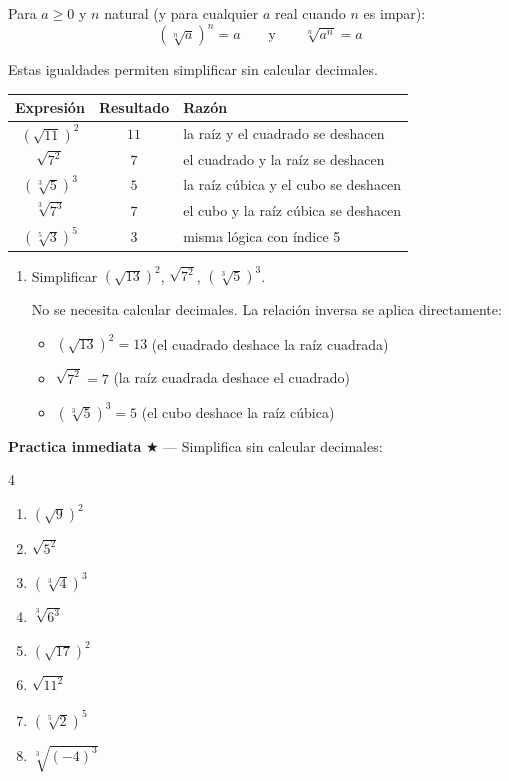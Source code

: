 \documentclass[11pt, letterpaper]{article}
\begin{document}
\begin{tcolorbox}[importantbox, title={Relación inversa — para cualquier índice}]
Para $a \geq 0$ y $n$ natural (y para cualquier $a$ real cuando $n$ es impar):
$$\left(\sqrt[n]{a}\right)^n = a \qquad\text{y}\qquad \sqrt[n]{a^n} = a$$

Estas igualdades permiten simplificar sin calcular decimales.
\begin{center}
\renewcommand{\arraystretch}{1.25}
\begin{tabular}{c|c|l}
\toprule
\textbf{Expresión} & \textbf{Resultado} & \textbf{Razón}\\
\midrule
$(\sqrt{11})^2$   & $11$ & la raíz y el cuadrado se deshacen\\
$\sqrt{7^2}$      & $7$  & el cuadrado y la raíz se deshacen\\
$(\sqrt[3]{5})^3$ & $5$  & la raíz cúbica y el cubo se deshacen\\
$\sqrt[3]{7^3}$   & $7$  & el cubo y la raíz cúbica se deshacen\\
$(\sqrt[5]{3})^5$ & $3$  & misma lógica con índice 5\\
\bottomrule
\end{tabular}
\end{center}
\end{tcolorbox}

\begin{tcolorbox}[examplebox, title={Ejemplos — relación inversa}]
\begin{enumerate}[label=\textbf{Ej. \arabic*.}, leftmargin=*, itemsep=10pt]
\item Simplificar $(\sqrt{13})^2$, $\sqrt{7^2}$, $(\sqrt[3]{5})^3$.

No se necesita calcular decimales. La relación inversa se aplica directamente:
\begin{itemize}[itemsep=3pt]
  \item $(\sqrt{13})^2 = 13$ \hfill (el cuadrado deshace la raíz cuadrada)
  \item $\sqrt{7^2} = 7$ \hfill (la raíz cuadrada deshace el cuadrado)
  \item $(\sqrt[3]{5})^3 = 5$ \hfill (el cubo deshace la raíz cúbica)
\end{itemize}
\end{enumerate}
\end{tcolorbox}

\medskip
\textbf{Practica inmediata} \quad $\bigstar$ — Simplifica sin calcular decimales:
\begin{multicols}{4}
\begin{enumerate}[label=\alph*), leftmargin=*]
  \item $(\sqrt{9})^2$
  \item $\sqrt{5^2}$
  \item $(\sqrt[3]{4})^3$
  \item $\sqrt[3]{6^3}$
  \item $(\sqrt{17})^2$
  \item $\sqrt{11^2}$
  \item $(\sqrt[5]{2})^5$
  \item $\sqrt[3]{(-4)^3}$
\end{enumerate}
\end{multicols}
\end{document}
